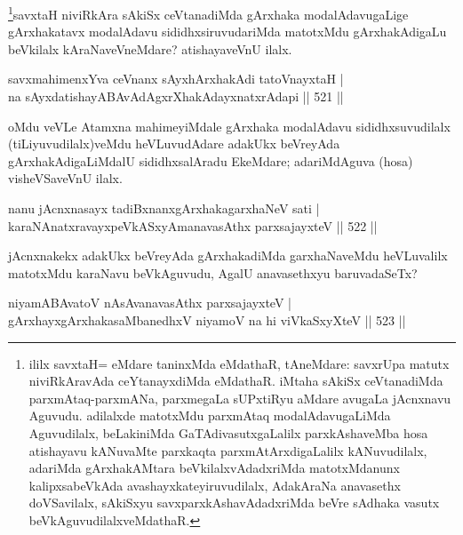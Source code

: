 \begin{artha}
\footnote{ililx savxtaH= eMdare taninxMda eMdathaR, tAneMdare: savxrUpa matutx niviRkAravAda ceYtanayxdiMda eMdathaR. iMtaha sAkiSx ceVtanadiMda parxmAtaq-parxmANa, parxmegaLa sUPxtiRyu aMdare avugaLa jAcnxnavu Aguvudu. adilalxde matotxMdu parxmAtaq modalAdavugaLiMda Aguvudilalx, beLakiniMda GaTAdivasutxgaLalilx parxkAshaveMba hosa atishayavu kANuvaMte parxkaqta parxmAtArxdigaLalilx kANuvudilalx, adariMda gArxhakAMtara beVkilalxvAdadxriMda matotxMdanunx kalipxsabeVkAda avashayxkateyiruvudilalx, AdakAraNa anavasethx doVSavilalx, sAkiSxyu savxparxkAshavAdadxriMda beVre sAdhaka vasutx beVkAguvudilalxveMdathaR.}savxtaH niviRkAra sAkiSx ceVtanadiMda gArxhaka modalAdavugaLige gArxhakatavx modalAdavu sididhxsiruvudariMda matotxMdu gArxhakAdigaLu beVkilalx kAraNaveVneMdare? atishayaveVnU ilalx.
\end{artha}

\begin{shl}
savxmahimenxYva ceVnanx sAyxhArxhakAdi tatoV\s nayxtaH | \\
na sAyxdatishayABAvAdAgxrXhakAdayxnatxrAdapi \hfill||  521 ||  
\end{shl}

\begin{artha}
oMdu veVLe Atamxna mahimeyiMdale gArxhaka modalAdavu sididhxsuvudilalx (tiLiyuvudilalx)veMdu  heVLuvudAdare adakUkx beVreyAda gArxhakAdigaLiMdalU sididhxsalAradu EkeMdare; adariMdAguva (hosa) visheVSaveVnU ilalx.
\end{artha}


\begin{shl}
nanu jAcnxnasayx tadiBxnanxgArxhakagarxhaNeV sati | \\
karaNAnatxravayxpeVkASxyAmanavasAthx parxsajayxteV \hfill||  522 ||  
\end{shl}

\begin{artha}
jAcnxnakekx adakUkx beVreyAda gArxhakadiMda garxhaNaveMdu heVLuvalilx matotxMdu karaNavu beVkAguvudu, AgalU anavasethxyu baruvadaSeTx?
\end{artha}


\begin{shl}
niyamABAvatoV nAsAvanavasAthx parxsajayxteV | \\
gArxhayxgArxhakasaMbanedhxV niyamoV na hi viVkaSxyXteV \hfill||  523 ||  
\end{shl}

